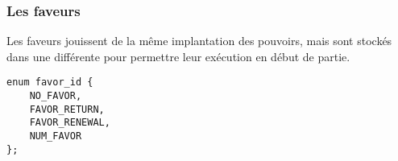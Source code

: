 
\subsubsection{Les faveurs}
\label{favors}

Les faveurs jouissent de la même implantation des pouvoirs, mais sont stockés dans une  différente pour permettre leur exécution en début de partie.

\begin{lstlisting}[frame=single, caption={Enumération des faveurs}]
enum favor_id {
	NO_FAVOR,
	FAVOR_RETURN,
	FAVOR_RENEWAL,
	NUM_FAVOR
};
\end{lstlisting}
